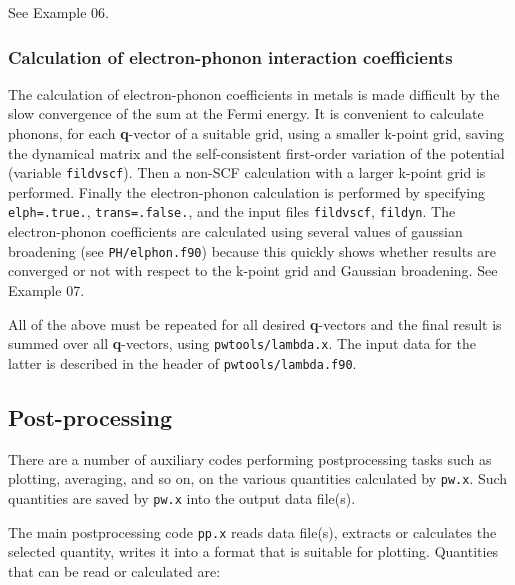 \documentclass[12pt,a4paper]{article}
\begin{document}
See Example 06.

\subsubsection{Calculation of electron-phonon interaction
coefficients}

The calculation of electron-phonon coefficients in metals is made
difficult by the slow convergence of the sum at the Fermi energy.
It is convenient to calculate phonons, for each \textbf{q}-vector of a
suitable grid, using a smaller k-point grid, saving the dynamical
matrix and the self-consistent first-order variation of the potential
(variable \texttt{fildvscf}).
Then a non-SCF calculation with a larger k-point grid is performed.
Finally the electron-phonon calculation is performed by specifying
\texttt{elph=.true.}, \texttt{trans=.false.}, and the input files
\texttt{fildvscf}, \texttt{fildyn}.
The electron-phonon coefficients are calculated using several values
of gaussian broadening (see \texttt{PH/elphon.f90}) because this
quickly shows whether results are converged or not with respect to the
k-point grid and Gaussian broadening. See Example 07.

All of the above must be repeated for all desired \textbf{q}-vectors
and the final result is summed over all \textbf{q}-vectors, using
\texttt{pwtools/lambda.x}. The input data for the latter is
described in the header of \texttt{pwtools/lambda.f90}.

\subsection{Post-processing}

There are a number of auxiliary codes performing postprocessing tasks
such as plotting, averaging, and so on, on the various quantities
calculated by \texttt{pw.x}.
Such quantities are saved by \texttt{pw.x} into the output data
file(s).

The main postprocessing code \texttt{pp.x} reads data file(s),
extracts or calculates the selected quantity, writes it into
a format that is suitable for plotting. Quantities that can
be read or calculated are:
\end{document}
